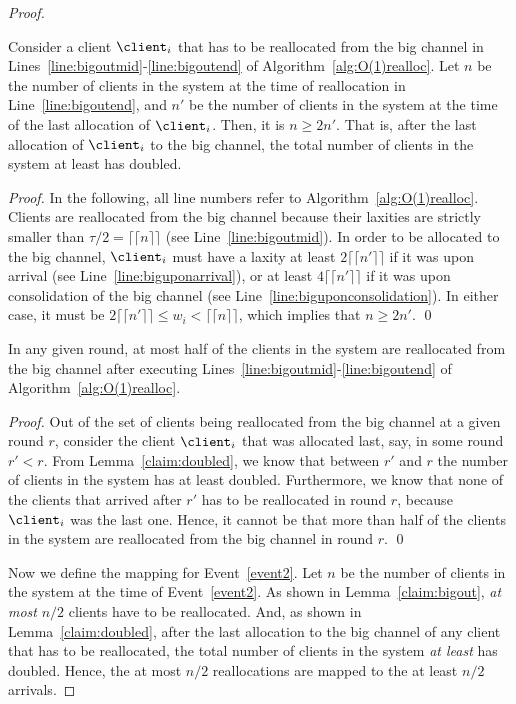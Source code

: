 \begin{proof}
\begin{lemma}
\label{claim:doubled}
Consider a client $\client_i$ that has to be reallocated from the big channel in Lines~\ref{line:bigoutmid}-\ref{line:bigoutend} of Algorithm~\ref{alg:O(1)realloc}. 
Let $n$ be the number of clients in the system at the time of reallocation in Line~\ref{line:bigoutend}, and
$n'$ be the number of clients in the system at the time of the last allocation of $\client_i$.
Then, it is $n\geq 2n'$.
That is, after the last allocation of $\client_i$ to the big channel, the total number of clients in the system at least has doubled.
\end{lemma}
\begin{proof}
In the following, all line numbers refer to Algorithm~\ref{alg:O(1)realloc}.
Clients are reallocated from the big channel because their laxities are strictly smaller than $\tau/2= \lceil\lceil n \rceil\rceil$ (see Line~\ref{line:bigoutmid}).
In order to be allocated to the big channel, $\client_i$ must have a laxity at least $2\lceil\lceil n' \rceil\rceil$ if it was upon arrival (see Line~\ref{line:biguponarrival}), or at least $4\lceil\lceil n' \rceil\rceil$ if it was upon consolidation of the big channel (see Line~\ref{line:biguponconsolidation}). In either case, it must be $2\lceil\lceil n' \rceil\rceil\leq w_i < \lceil\lceil n \rceil\rceil$, which implies that $n\geq 2n'$.
\qed\end{proof}

\begin{lemma}
\label{claim:bigout}
In any given round, at most half of the clients in the system are reallocated from the big channel after executing Lines~\ref{line:bigoutmid}-\ref{line:bigoutend} of Algorithm~\ref{alg:O(1)realloc}.
\end{lemma}
\begin{proof}
Out of the set of clients being reallocated from the big channel at a given round $r$, consider the client $\client_i$ that was allocated last, say, in some round $r'<r$.
From Lemma~\ref{claim:doubled}, we know that between $r'$ and $r$ the number of clients in the system has at least doubled. Furthermore, we know that none of the clients that arrived after $r'$ has to be reallocated in round $r$, because $\client_i$ was the last one. Hence, it cannot be that more than half of the clients in the system are reallocated from the big channel in round $r$.
\qed\end{proof}

Now we define the mapping for Event~\ref{event2}. Let $n$ be the number of clients in the system at the time of Event~\ref{event2}. As shown in Lemma~\ref{claim:bigout}, \emph{at most} $n/2$ clients have to be reallocated. And, as shown in Lemma~\ref{claim:doubled}, after the last allocation to the big channel of any client that has to be reallocated, the total number of clients in the system \emph{at least} has doubled. Hence, the at most $n/2$ reallocations are mapped to the at least $n/2$ arrivals.


\end{proof}
